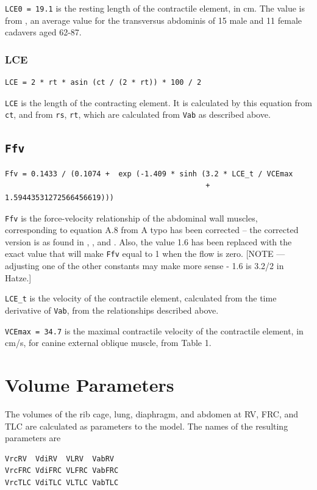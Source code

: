 \documentclass[12pt,openany,oneside]{book}
\begin{document}
\verb~LCE0 = 19.1~ is the resting length of the contractile element,
in cm. The value is from \citet{springerlink:10.1007/BF01576742}, an
average value for the transversus abdominis of 15 male and 11 female
cadavers aged 62-87.

\subsubsection{LCE}
\begin{verbatim}
LCE = 2 * rt * asin (ct / (2 * rt)) * 100 / 2
\end{verbatim}
\verb~LCE~ is the length of the contracting element. It is calculated
by this equation from \verb~ct~, and from \verb~rs~, \verb~rt~, which
are calculated from \verb~Vab~ as described above.

\subsection{\texttt{Ffv}}
\begin{verbatim}
Ffv = 0.1433 / (0.1074 +  exp (-1.409 * sinh (3.2 * LCE_t / VCEmax
                                              + 1.59443531272566456619)))
\end{verbatim}
\verb~Ffv~ is the force-velocity relationship of the abdominal wall
muscles, corresponding to equation A.8 from \citet{Ratnovsky20031771}
A typo has been corrected -- the corrected version is as found in
\citet{1545509}, \citet{Rosen1999415}, and \citet{Hatze1981}. Also,
the value 1.6 has been replaced with the exact value that will make
\verb~Ffv~ equal to 1 when the flow is zero. [NOTE --- adjusting one
of the other constants may make more sense - 1.6 is 3.2/2 in Hatze.]

\verb~LCE_t~ is the velocity of the contractile element, calculated
from the time derivative of \verb~Vab~, from the relationships
described above.

\verb~VCEmax = 34.7~ is the maximal contractile velocity of the
contractile element, in cm/s, for canine external oblique muscle, from
\citet{Ratnovsky20031771} Table 1.

\section{Volume Parameters}
\label{Volume Parameters}

The volumes of the rib cage, lung, diaphragm, and abdomen at RV, FRC,
and TLC are calculated as parameters to the model. The names of the
resulting parameters are
\begin{verbatim}
VrcRV  VdiRV  VLRV  VabRV 
VrcFRC VdiFRC VLFRC VabFRC
VrcTLC VdiTLC VLTLC VabTLC
\end{verbatim}
\end{document}
